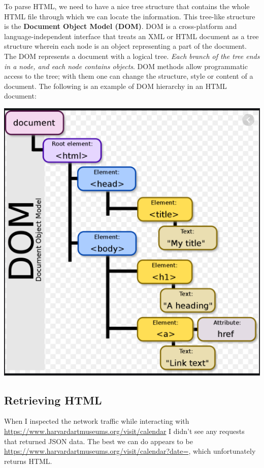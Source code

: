 \documentclass[]{book}
\begin{document}
To parse HTML, we need to have a nice tree structure that contains the whole HTML file through which we can locate the information. This tree-like structure is the \textbf{Document Object Model (DOM)}. DOM is a cross-platform and language-independent interface that treats an XML or HTML document as a tree structure wherein each node is an object representing a part of the document. The DOM represents a document with a logical tree. \emph{Each branch of the tree ends in a node, and each node contains objects}. DOM methods allow programmatic access to the tree; with them one can change the structure, style or content of a document. The following is an example of DOM hierarchy in an HTML document:

\includegraphics{Python/PythonWebScrape/images/DOM.png}

\hypertarget{retrieving-html}{%
\subsection{Retrieving HTML}\label{retrieving-html}}

When I inspected the network traffic while interacting
with \url{https://www.harvardartmuseums.org/visit/calendar} I didn't see
any requests that returned JSON data. The best we can do appears to be
\url{https://www.harvardartmuseums.org/visit/calendar?date=}, which
unfortunately returns HTML.
\end{document}
